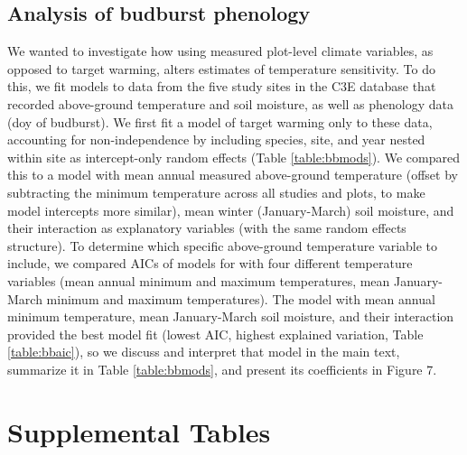 \documentclass{article}
\begin{document}
\subsection* {Analysis of budburst phenology}
We wanted to investigate how using measured plot-level climate variables, as opposed to target warming, alters estimates of temperature sensitivity. To do this, we fit models to data from the five study sites in the C3E database that recorded above-ground temperature and soil moisture, as well as phenology data (doy of budburst). We first fit a model of target warming only to these data, accounting for non-independence by including species, site, and year nested within site as intercept-only random effects (Table \ref{table:bbmods}). We compared this to a model with mean annual measured above-ground temperature (offset by subtracting the minimum temperature across all studies and plots, to make model intercepts more similar), mean winter (January-March) soil moisture, and their interaction as explanatory variables (with the same random effects structure). To determine which specific above-ground temperature variable to include, we compared AICs of models for with four different temperature variables (mean annual minimum and maximum temperatures, mean January-March minimum and maximum temperatures). The model with mean annual minimum temperature, mean January-March soil moisture, and their interaction provided the best model fit (lowest AIC, highest explained variation, Table \ref{table:bbaic}), so we discuss and interpret that model in the main text, summarize it in Table \ref{table:bbmods}, and present its coefficients in Figure 7. 


\section* {Supplemental Tables} 
\end{document}
